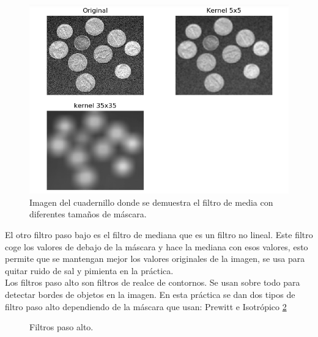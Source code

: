 \documentclass[a4paper,12pt]{report}
\begin{document}
\begin{figure}[h]
\centering
\includegraphics[width=1\textwidth]{imagenes/filtromedia}
\caption{Imagen del cuadernillo donde se demuestra el filtro de media con diferentes tamaños de máscara.}
\label{filtromedia}
\end{figure}

El otro filtro paso bajo es el filtro de mediana que es un filtro no lineal. Este filtro coge los valores de debajo de la máscara y  hace la mediana con esos valores, esto permite que se mantengan mejor los valores originales de la imagen, se usa para quitar ruido de sal y pimienta en la práctica.\\

Los filtros paso alto son filtros de realce de contornos. Se usan sobre todo para detectar bordes de objetos en la imagen. En esta práctica se dan dos tipos de filtro paso alto dependiendo de la máscara que usan: Prewitt e Isotrópico \ref{fpa}

\begin{figure}[!tbp]
  \centering
  \hfill
  \caption{Filtros paso alto.}
  \label{fpa}
\end{figure}
\end{document}
